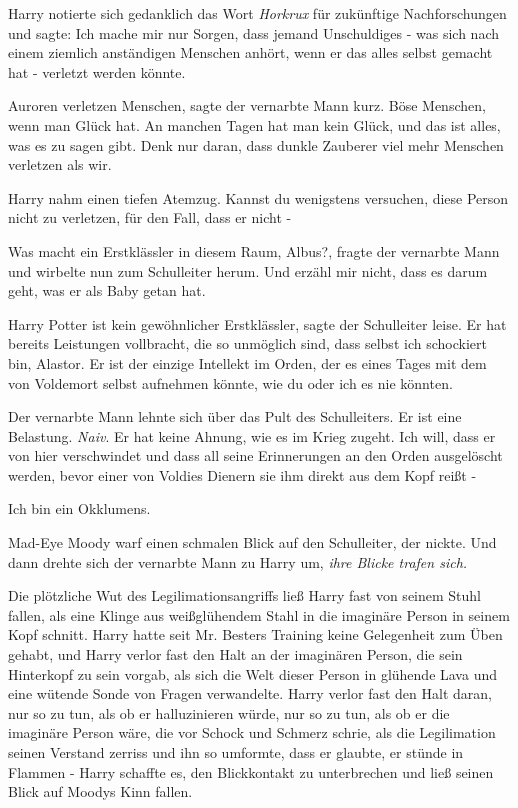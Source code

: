Harry notierte sich gedanklich das Wort \emph{Horkrux} für zukünftige
Nachforschungen und sagte: \glqq Ich mache mir nur Sorgen, dass jemand
Unschuldiges - was sich nach einem ziemlich anständigen Menschen anhört, wenn er
das alles selbst gemacht hat - verletzt werden könnte.\grqq{}

\glqq Auroren verletzen Menschen\grqq{}, sagte der vernarbte Mann kurz. \glqq
Böse Menschen, wenn man Glück hat. An manchen Tagen hat man kein Glück, und das
ist alles, was es zu sagen gibt. Denk nur daran, dass dunkle Zauberer viel mehr
Menschen verletzen als wir.\grqq{}

Harry nahm einen tiefen Atemzug. \glqq Kannst du wenigstens versuchen, diese
Person nicht zu verletzen, für den Fall, dass er nicht -\grqq{}

\glqq Was macht ein Erstklässler in diesem Raum, Albus?\grqq{}, fragte der
vernarbte Mann und wirbelte nun zum Schulleiter herum. \glqq Und erzähl mir
nicht, dass es darum geht, was er als Baby getan hat.\grqq{}

\glqq Harry Potter ist kein gewöhnlicher Erstklässler\grqq{}, sagte der
Schulleiter leise. \glqq Er hat bereits Leistungen vollbracht, die so unmöglich
sind, dass selbst ich schockiert bin, Alastor. Er ist der einzige Intellekt im
Orden, der es eines Tages mit dem von Voldemort selbst aufnehmen könnte, wie du
oder ich es nie könnten.\grqq{}

Der vernarbte Mann lehnte sich über das Pult des Schulleiters. \glqq Er ist eine
Belastung. \emph{Naiv}. Er hat keine Ahnung, wie es im Krieg zugeht. Ich will,
dass er von hier verschwindet und dass all seine Erinnerungen an den Orden
ausgelöscht werden, bevor einer von Voldies Dienern sie ihm direkt aus dem Kopf
reißt -\grqq{}

\glqq Ich bin ein Okklumens.\grqq{}

Mad-Eye Moody warf einen schmalen Blick auf den Schulleiter, der nickte. Und
dann drehte sich der vernarbte Mann zu Harry um,\emph{ ihre Blicke trafen sich.
}

Die plötzliche Wut des Legilimationsangriffs ließ Harry fast von seinem Stuhl
fallen, als eine Klinge aus weißglühendem Stahl in die imaginäre Person in
seinem Kopf schnitt. Harry hatte seit Mr. Besters Training keine Gelegenheit zum
Üben gehabt, und Harry verlor fast den Halt an der imaginären Person, die sein
Hinterkopf zu sein vorgab, als sich die Welt dieser Person in glühende Lava und
eine wütende Sonde von Fragen verwandelte. Harry verlor fast den Halt daran, nur
so zu tun, als ob er halluzinieren würde, nur so zu tun, als ob er die imaginäre
Person wäre, die vor Schock und Schmerz schrie, als die Legilimation seinen
Verstand zerriss und ihn so umformte, dass er glaubte, er stünde in Flammen -
Harry schaffte es, den Blickkontakt zu unterbrechen und ließ seinen Blick auf
Moodys Kinn fallen.

